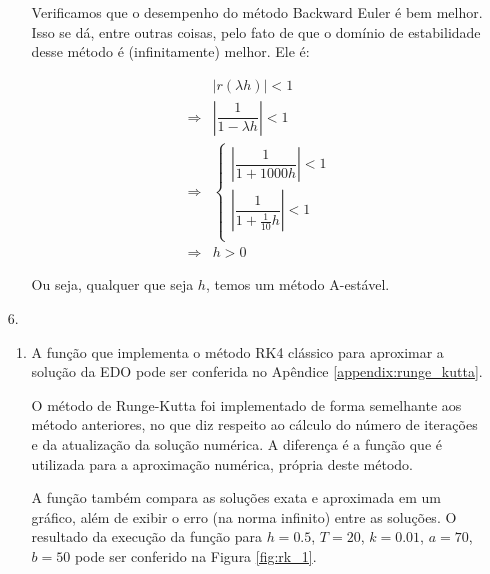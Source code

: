 \documentclass{article}
\begin{document}
\begin{enumerate}
\begin{enumerate}
                    Verificamos que o desempenho do método
                    Backward Euler é bem melhor. Isso se dá,
                    entre outras coisas, pelo fato de que
                    o domínio de estabilidade desse método é
                    (infinitamente) melhor. Ele é:

                    \begin{align*}
                        &|r(\lambda h)| < 1 \\
                        \Rightarrow &\left|\dfrac{1}{1 - \lambda h}\right| < 1 \\
                        \Rightarrow &\begin{cases}
                            \left|\dfrac{1}{1 + 1000 h}\right| < 1 \\
                            \left|\dfrac{1}{1 + \frac{1}{10} h}\right| < 1 \\
                        \end{cases} \\
                        \Rightarrow & h > 0
                    \end{align*}

                    Ou seja, qualquer que seja $h$, temos um método A-estável.

            \end{enumerate}

            \pagebreak

            \item[6.]
                \begin{enumerate}
                    \item A função que implementa o método RK4 clássico
                        para aproximar a solução da EDO pode ser conferida
                        no Apêndice \ref{appendix:runge_kutta}.

                        O método de Runge-Kutta foi implementado de forma
                        semelhante aos método anteriores, no que diz respeito
                        ao cálculo do número de iterações e da atualização
                        da solução numérica. A diferença é a função que é 
                        utilizada para a aproximação numérica, própria deste
                        método.

                        A função também compara as soluções exata e aproximada
                        em um gráfico, além de exibir o erro (na norma infinito)
                        entre as soluções. O resultado da execução da função para
                        $h = 0.5$, $T = 20$, $k = 0.01$, $a = 70$, $b = 50$ pode ser
                        conferido na Figura \ref{fig:rk_1}.
                

\end{enumerate}
\end{enumerate}
\end{document}
